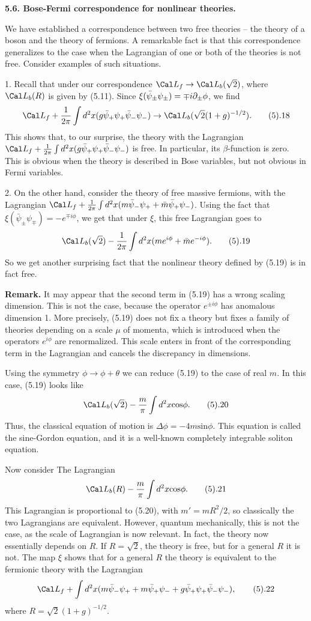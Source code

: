 {\bf 5.6. Bose-Fermi correspondence for nonlinear theories.}

We have established a correspondence between two free theories -- the 
theory of a boson and the theory of fermions. A remarkable fact is
that this correspondence generalizes to the case when the Lagrangian 
of one or both of the theories is not free. Consider examples of such 
situations.  

1. Recall that under our correspondence $\Cal L_f\to \Cal L_b(\sqrt{2})$, 
where $\Cal L_b(R)$ is given by (5.11). Since
$\xi(\bar\psi_\pm\psi_\pm)=\mp i \partial_\pm \phi$, we 
find
$$
\Cal L_f+\frac{1}{2\pi}\int d^2x(g\bar\psi_+\psi_+\bar\psi_-\psi_-)\to 
\Cal L_b(\sqrt{2}(1+ g)^{-1/2}).\tag 5.18
$$ 
This shows that, to our surprise, the theory with the Lagrangian
$\Cal L_f+\frac{1}{2\pi}\int d^2x(g\bar\psi_+\psi_+\bar\psi_-\psi_-)$ is free. 
In particular, its $\beta$-function is zero. This is obvious when 
the theory is described in Bose variables, but not obvious 
in Fermi variables.  

2. On the other hand, consider the theory of free massive 
fermions, with the Lagrangian 
$\Cal L_f+\frac{1}{2\pi}\int d^2x(m\bar\psi_-\psi_++\bar m\bar\psi_+\psi_-)$. 
Using the fact that $\xi(\bar\psi_\pm\psi_\mp)=-e^{\mp i\phi}$, we
get that under $\xi$, this free Lagrangian goes to
$$
\Cal L_b(\sqrt{2})-\frac{1}{2\pi}
\int d^2x(me^{i\phi}+\bar me^{-i\phi}).\tag 5.19
$$   
So we get another surprising fact that the nonlinear theory defined by 
(5.19) is in fact free. 

{\bf Remark.} It may appear that the second term in (5.19) has a wrong 
scaling dimension. This is not the case, because the 
operator $e^{\pm i\phi}$ has anomalous dimension 1. More precisely, 
(5.19) does not fix a theory but fixes a family of theories 
depending on a scale $\mu$ of momenta, which is introduced when the operators
$e^{i\phi}$ are renormalized. This scale enters in front of the 
corresponding term in the Lagrangian and cancels the discrepancy in 
dimensions. 

Using the symmetry $\phi\to \phi+\theta$
 we can reduce (5.19) to the case of real $m$. In this case,
(5.19) looks like
$$
\Cal L_b(\sqrt{2})-\frac{m}{\pi}\int d^2x \text{cos}\phi.\tag 5.20
$$   
Thus,  
the classical equation of motion is $\Delta\phi=-4 m \text{sin} \phi$. 
This equation is called the sine-Gordon equation, and it 
is a well-known completely integrable soliton equation. 

Now consider The Lagrangian
$$
\Cal L_b(R)-\frac{m}{\pi}\int d^2x \text{cos}\phi.\tag 5.21
$$
This Lagrangian is proportional to (5.20), 
with $m'=mR^2/2$, so classically the two Lagrangians 
are equivalent. However, quantum mechanically, this is not the case, 
as the scale of Lagrangian is now relevant. In fact, the theory now 
essentially depends on $R$. If $R=\sqrt{2}$, the theory is free, 
but for a general $R$ it is not. The map $\xi$ shows that for a general 
$R$ the theory is equivalent to the fermionic theory with the Lagrangian
$$
\Cal L_f+\int d^2x(m\bar\psi_-\psi_++m\bar\psi_+\psi_-+ 
g\bar\psi_+\psi_+\bar\psi_-\psi_-),\tag 5.22
$$
where $R=\sqrt{2}(1+g)^{-1/2}$. 


